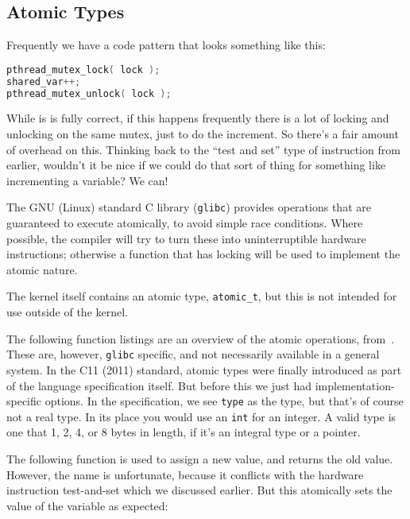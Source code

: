 




\subsection*{Atomic Types}

Frequently we have a code pattern that looks something like this:

\begin{lstlisting}[language=C]
pthread_mutex_lock( lock );
shared_var++;
pthread_mutex_unlock( lock );
\end{lstlisting}

While is is fully correct, if this happens frequently there is a lot of locking and unlocking on the same mutex, just to do the increment. So there's a fair amount of overhead on this. Thinking back to the ``test and set'' type of instruction from earlier, wouldn't it be nice if we could do that sort of thing for something like incrementing a variable? We can!

The GNU (Linux) standard C library (\texttt{glibc}) provides operations that are guaranteed to execute atomically, to avoid simple race conditions. Where possible, the compiler will try to turn these into uninterruptible hardware instructions; otherwise a function that has locking will be used to implement the atomic nature.

The kernel itself contains an atomic type, \texttt{atomic\_t}, but this is not intended for use outside of the kernel.

The following function listings are an overview of the atomic operations, from~\cite{gccatomic}. These are, however, \texttt{glibc} specific, and not necessarily available in a general system. In the C11 (2011) standard, atomic types were finally introduced as part of the language specification itself. But before this we just had implementation-specific options. In the specification, we see \texttt{type} as the type, but that's of course not a real type. In its place you would use an \texttt{int} for an integer. A valid type is one that 1, 2, 4, or 8 bytes in length, if it's an integral type or a pointer.

The following function is used to assign a new value, and returns the old value. However, the name is unfortunate, because it conflicts with the hardware instruction test-and-set which we discussed earlier. But this atomically sets the value of the variable as expected:

